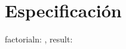\documentclass{article}
\begin{document}
\section{Especificación}

\begin{proc}{factorial}{\In n: \ent, \Out result: \ent}{}
\end{proc}

\begin{verbatim}
\end{verbatim}
\end{document}
